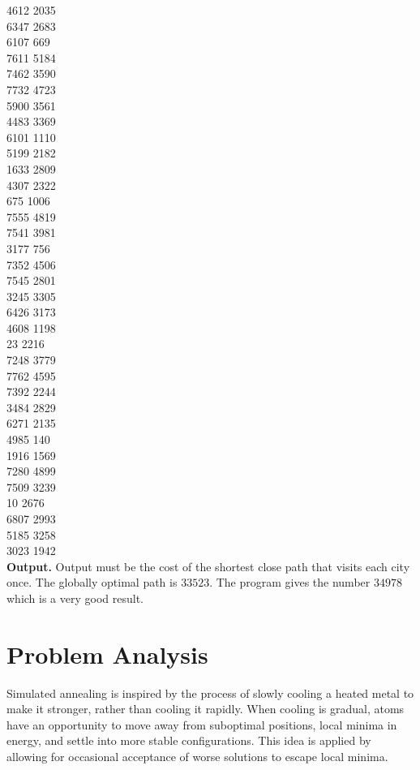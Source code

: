 \documentclass{article}
\begin{document}
4612 2035   \\
6347 2683   \\
6107  669   \\
7611 5184   \\
7462 3590   \\
7732 4723   \\
5900 3561   \\
4483 3369   \\
6101 1110   \\
5199 2182   \\
1633 2809   \\
4307 2322   \\
 675 1006   \\
7555 4819   \\
7541 3981   \\
3177  756   \\
7352 4506   \\
7545 2801   \\
3245 3305   \\
6426 3173   \\
4608 1198   \\
  23 2216   \\
7248 3779   \\
7762 4595   \\
7392 2244   \\
3484 2829   \\
6271 2135   \\
4985  140   \\
1916 1569   \\
7280 4899   \\
7509 3239   \\
  10 2676   \\
6807 2993   \\
5185 3258   \\
3023 1942   \\

\textbf{Output.} Output must be the cost of the shortest close path that visits each city once. The globally optimal path is $33523$. The program gives the number $34978$ which is a very good result.  

\section{Problem Analysis}
\label{analysis}

Simulated annealing is inspired by the process of slowly cooling a heated metal to make it stronger, rather than cooling it rapidly. When cooling is gradual, atoms have an opportunity to move away from suboptimal positions, local minima in energy, and settle into more stable configurations. This idea is applied by allowing for occasional acceptance of worse solutions to escape local minima.
\end{document}
